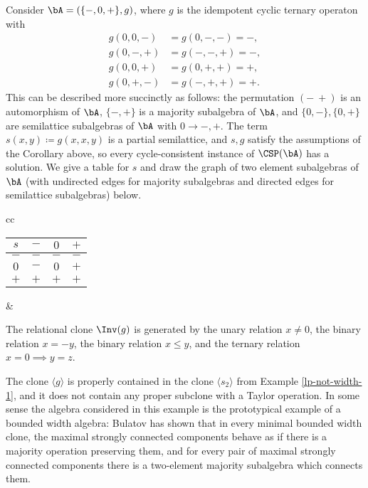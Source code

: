 \begin{ex}\label{ex-slippery} Consider $\bA = (\{-,0,+\},g)$, where $g$ is the idempotent cyclic ternary operaton with
\begin{align*}
g(0,0,-) &= g(0,-,-) = -,\\
g(0,-,+) &= g(-,-,+) = -,\\
g(0,0,+) &= g(0,+,+) = +,\\
g(0,+,-) &= g(-,+,+) = +.
\end{align*}
This can be described more succinctly as follows: the permutation $(-\ +)$ is an automorphism of $\bA$, $\{-,+\}$ is a majority subalgebra of $\bA$, and $\{0,-\}, \{0,+\}$ are semilattice subalgebras of $\bA$ with $0 \rightarrow -,+$. The term $s(x,y) \coloneqq g(x,x,y)$ is a partial semilattice, and $s,g$ satisfy the assumptions of the Corollary above, so every cycle-consistent instance of $\CSP(\bA)$ has a solution. We give a table for $s$ and draw the graph of two element subalgebras of $\bA$ (with undirected edges for majority subalgebras and directed edges for semilattice subalgebras) below.
\begin{center}
\begin{tabular}{cc}%
\begin{tabular}{c|ccc} $s$ & $-$ & $0$ & $+$\\ \hline $-$ & $-$ & $-$ & $-$\\ $0$ & $-$ & $0$ & $+$\\ $+$ & $+$ & $+$ & $+$\end{tabular} & 
\end{tabular}
\end{center}

The relational clone $\Inv(g)$ is generated by the unary relation $x \ne 0$, the binary relation $x = -y$, the binary relation $x \le y$, and the ternary relation $x = 0 \implies y = z$.

The clone $\langle g \rangle$ is properly contained in the clone $\langle s_2 \rangle$ from Example \ref{lp-not-width-1}, and it does not contain any proper subclone with a Taylor operation. In some sense the algebra considered in this example is the prototypical example of a bounded width algebra: Bulatov \cite{bulatov-bounded} has shown that in every minimal bounded width clone, the maximal strongly connected components behave as if there is a majority operation preserving them, and for every pair of maximal strongly connected components there is a two-element majority subalgebra which connects them.
\end{ex}

